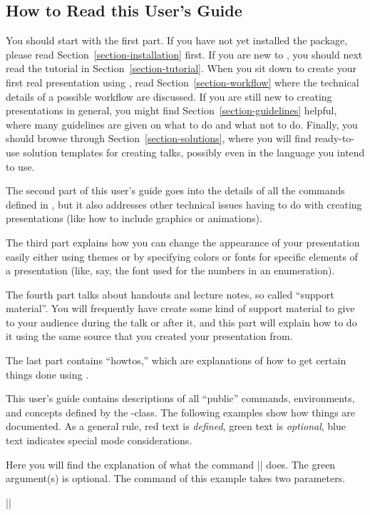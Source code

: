 \subsection{How to Read this User's Guide}

You should start with the first part. If you have not yet installed the package, please read Section~\ref{section-installation} first. If you are new to \beamer, you should next read the tutorial in Section~\ref{section-tutorial}. When you sit down to create your first real presentation using \beamer, read Section~\ref{section-workflow} where the technical details of a possible workflow are discussed. If you are still new to creating presentations in general, you might find Section~\ref{section-guidelines} helpful, where many guidelines are given on what to do and what not to do. Finally, you should browse through Section~\ref{section-solutions}, where you will find ready-to-use solution templates for creating talks, possibly even in the language you intend to use.

The second part of this user's guide goes into the details of all the commands defined in \beamer, but it also addresses  other technical issues having to do with creating presentations (like how to include graphics or animations).

The third part explains how you can change the appearance of your presentation easily either using themes or by specifying colors or fonts for specific elements of a presentation (like, say, the font used for the numbers in an enumeration).

The fourth part talks about handouts and lecture notes, so called ``support material''. You will frequently have create some kind of support material to give to your audience during the talk or after it, and this part will explain how to do it using the same source that you created your presentation from.

The last part contains ``howtos,'' which are explanations of how to get certain things done using \beamer.

\medskip
\noindent
This user's guide contains descriptions of all ``public'' commands, environments, and concepts defined by the \beamer-class. The following examples show how things are documented. As a general rule, red text is \emph{defined}, green text is \emph{optional}, blue text indicates special mode considerations.

\begingroup
\noindexing
\begin{command}{\somebeamercommand{}}
  Here you will find the explanation of what the command |\somebeamercommand| does. The green argument(s) is optional. The command of this example takes two parameters.

  \example
  ||
\end{command}

